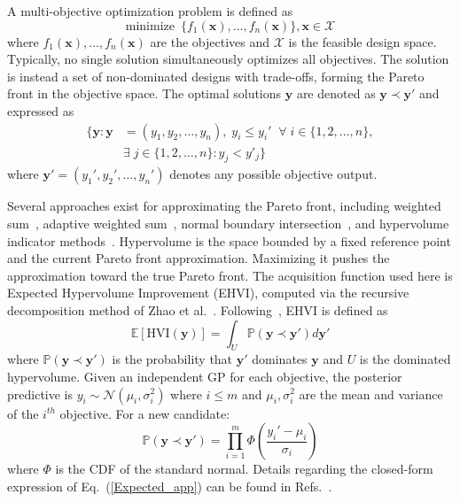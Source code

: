 \documentclass[preprint,12pt,times]{elsarticle}  %
\begin{document}
A multi-objective optimization problem is defined as
\begin{equation}
\label{eq:problem_app}
    \mbox{minimize}\,\,\,  \{f_1(\textbf{x}), ...,f_n(\textbf{x})\}, \textbf{x} \in \mathcal{X}
\end{equation}
where $f_1(\textbf{x}),\ldots, f_n(\textbf{x})$ are the objectives and $\mathcal{X}$ is the feasible design space. Typically, no single solution simultaneously optimizes all objectives. The solution is instead a set of non-dominated designs with trade-offs, forming the Pareto front in the objective space. The optimal solutions $\mathbf{y}$ are denoted as $\mathbf{y}\prec \mathbf{y'}$ and expressed as
\begin{equation}
\begin{aligned}
   \{\mathbf{y}: \mathbf{y} & = (y_1, y_2, \ldots, y_n), \; y_i \leq y_i' \;\; \forall \; i \in \{1, 2, \ldots, n\}, \\
   &  \exists \; j \in \{1, 2, \ldots, n\} : y_j < y'_j\}
\end{aligned}
\end{equation}
where $\mathbf{y}' = (y_1', y_2', \ldots, y_n')$ denotes any possible objective output.

Several approaches exist for approximating the Pareto front, including weighted sum~\cite{marler2010weighted}, adaptive weighted sum~\cite{kim2005adaptive}, normal boundary intersection~\cite{das1998normal}, and hypervolume indicator methods~\cite{beume2009s,bradstreet2010fast,emmerich2011hypervolume,fonseca2006improved,russo2013quick,yang2007novel,zitzler1999multiobjective}. Hypervolume is the space bounded by a fixed reference point and the current Pareto front approximation. Maximizing it pushes the approximation toward the true Pareto front. The acquisition function used here is Expected Hypervolume Improvement (EHVI), computed via the recursive decomposition method of Zhao et al.~\cite{zhao2018fast}. Following~\cite{feliot2017bayesian}, EHVI is defined as
\begin{equation}
    \mathbb{E}[\textrm{{HVI}}({\mathbf{y}})] =\int_U \mathbb{P}(\mathbf{y} \prec{\mathbf{y}'})d{{\mathbf{y}'}}
    \label{Expected_app}
\end{equation}
where $\mathbb{P}(\mathbf{y} \prec \mathbf{y}')$ is the probability that $\mathbf{y}'$ dominates $\mathbf{y}$ and $U$ is the dominated hypervolume. Given an independent GP for each objective, the posterior predictive is $y_i \sim \mathcal{N}(\mu_i , \sigma_i^2)$ where $i\leq m$ and $\mu_i,\sigma_i^2$ are the mean and variance of the $i^{th}$ objective. For a new candidate:
\begin{equation}
    \mathbb{P}(\mathbf{y} \prec \mathbf{y}') = \prod_{i=1}^m \Phi \left ( \frac{y_i' - \mu_i}{\sigma_i} \right )
    \label{prob_app}
\end{equation}
where $\Phi$ is the CDF of the standard normal. Details regarding the closed-form expression of Eq.~(\ref{Expected_app}) can be found in Refs.~\cite{zhao2018fast,feliot2017bayesian,while2011fast,jaszkiewicz2018improved,khatamsaz2020efficient}.
\end{document}
